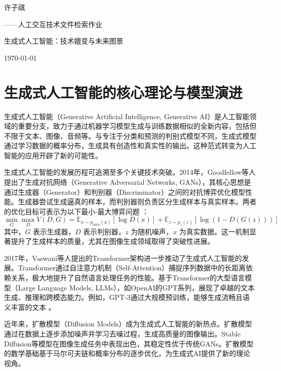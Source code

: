 \documentclass{ctexart}
\begin{document}
\begin{titlepage}
    \centering
    { 许子祺\par}
    \vspace{0.5cm}
    { ——人工交互技术文件检索作业\par}
    \vspace{1cm}
    { 生成式人工智能：技术嬗变与未来图景\par}
    \vspace{1cm}
    { \today\par}
\end{titlepage}

\section{生成式人工智能的核心理论与模型演进}

生成式人工智能（Generative Artificial Intelligence, Generative AI）\cite{banh2023generative}是人工智能领域的重要分支，致力于通过机器学习模型生成与训练数据相似的全新内容，包括但不限于文本、图像、音频等。与专注于分类和预测的判别式模型不同，生成式模型通过学习数据的概率分布，生成具有创造性和真实性的输出。这种范式转变为人工智能的应用开辟了新的可能性\cite{ooi2025potential}。

生成式人工智能的发展历程可追溯至多个关键技术突破。2014年，Goodfellow等人提出了生成对抗网络（Generative Adversarial Networks, GANs）\cite{saxena2021generative}，其核心思想是通过生成器（Generator）和判别器（Discriminator）之间的对抗博弈优化模型性能。生成器尝试生成逼真的样本，而判别器则负责区分生成样本与真实样本。两者的优化目标可表示为以下最小-最大博弈问题 \cite{goodfellow2014generative}：
\[
\min_G \max_D V(D, G) = \mathbb{E}_{x \sim p_{\text{data}}(x)}[\log D(x)] + \mathbb{E}_{z \sim p_z(z)}[\log (1 - D(G(z)))]
\]
其中，\(G\) 表示生成器，\(D\) 表示判别器，\(z\) 为随机噪声，\(x\) 为真实数据。这一机制显著提升了生成样本的质量，尤其在图像生成领域取得了突破性进展。

2017年，Vaswani等人提出的Transformer架构进一步推动了生成式人工智能的发展。Transformer通过自注意力机制（Self-Attention）捕捉序列数据中的长距离依赖关系，极大地提升了自然语言处理任务的性能。基于Transformer的大型语言模型（Large Language Models, LLMs），如OpenAI的GPT系列，展现了卓越的文本生成、推理和跨模态能力。例如，GPT-3通过大规模预训练，能够生成流畅且语义丰富的文本 \cite{vaswani2017attention}。

近年来，扩散模型（Diffusion Models）成为生成式人工智能的新热点。扩散模型通过在数据上逐步添加噪声并学习去噪过程，生成高质量的图像输出。Stable Diffusion等模型在图像生成任务中表现出色，其稳定性优于传统GANs。扩散模型的数学基础基于马尔可夫链和概率分布的逐步优化，为生成式AI提供了新的理论视角\cite{yang2023diffusion}。
\end{document}
